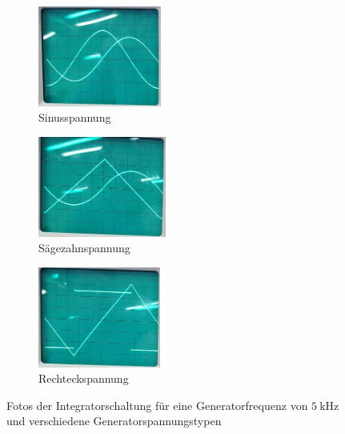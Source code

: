 \begin{figure}
    \centering
    \begin{subfigure}{0.3\textwidth}
        \centering
        \includegraphics[height=3.3cm]{images/foto_03_ausschnitt.jpg}
        \caption{Sinusspannung}
        \label{fig:foto_sin_integrator}
    \end{subfigure}
    \begin{subfigure}{0.3\textwidth}
        \centering
        \includegraphics[height=3.3cm]{images/foto_04_ausschnitt.jpg}
        \caption{Sägezahnspannung}
        \label{fig:foto_saege_integrator}
    \end{subfigure}
    \begin{subfigure}{0.3\textwidth}
        \centering
        \includegraphics[height=3.3cm]{images/foto_05_ausschnitt.jpg}
        \caption{Rechteckspannung}
        \label{fig:foto_rechteck_integrator}
    \end{subfigure}
    \caption{Fotos der Integratorschaltung für eine Generatorfrequenz von $\SI{5}{\kilo\hertz}$ und verschiedene Generatorspannungstypen}
    \label{fig:fotos_integrator}
\end{figure}

